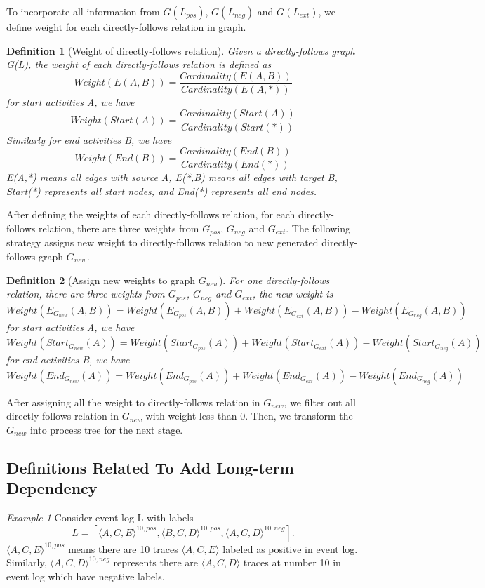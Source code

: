 \documentclass[]{article}
\newtheorem{mydef}{Definition}[section]
\begin{document}
To incorporate all information from  $G(L_{pos})$, $G(L_{neg})$ and $G(L_{ext})$, we define  weight for each directly-follows relation in graph. 
\begin{mydef}[Weight of directly-follows relation]
	Given a directly-follows graph G(L), the weight of each directly-follows relation is defined as \[ Weight(E(A,B)) = \frac{Cardinality(E(A,B))}{Cardinality(E(A,*))}  \] 
	for start activities A, we have 
	\[ Weight(Start(A)) = \frac{Cardinality(Start(A))}{Cardinality(Start(*))} \]
	Similarly for end activities B, we have
	\[ Weight(End(B)) = \frac{Cardinality(End(B))}{Cardinality(End(*))} \]
	E(A,*) means all edges with source A, E(*,B) means all edges with target B, Start(*) represents all start nodes, and End(*) represents all end nodes.
\end{mydef}
After defining the weights of each directly-follows relation, for each directly-follows relation, there are three weights from $G_{pos}$, $G_{neg}$ and $G_{ext}$. The following strategy assigns new weight to directly-follows relation to new generated directly-follows graph $G_{new}$.
\begin{mydef}[Assign new weights to graph $G_{new}$]
	For one directly-follows relation, there are three weights from $G_{pos}$, $G_{neg}$ and $G_{ext}$, the new weight is \[ Weight(E_{G_{new}}(A,B)) = Weight(E_{G_{pos}}(A,B)) + Weight(E_{G_{ext}}(A,B)) - Weight(E_{G_{neg}}(A,B))\]
		for start activities A, we have 
	\[ Weight(Start_{G_{new}}(A)) = Weight(Start_{G_{pos}}(A)) + Weight(Start_{G_{ext}}(A)) - Weight(Start_{G_{neg}}(A)) \]
	for end activities B, we have
	\[ Weight(End_{G_{new}}(A)) = Weight(End_{G_{pos}}(A)) + Weight(End_{G_{ext}}(A)) - Weight(End_{G_{neg}}(A)) \]
\end{mydef}
After assigning all the weight to directly-follows relation in $G_{new}$, we filter out all directly-follows relation in $G_{new}$ with weight less than 0. 
Then, we transform the $G_{new}$ into process tree for the next stage.

\subsection{Definitions Related To Add Long-term Dependency}
\textit{Example 1} Consider event log L with labels \[L =[\langle A,C,E \rangle^{10,pos}, \langle B,C,D \rangle^{10,pos}, \langle A,C,D \rangle^{10,neg}]. \] $\langle A,C,E \rangle^{10,pos}$ means there are 10 traces $\langle A,C,E \rangle$ labeled as positive in event log. Similarly, $\langle A,C,D \rangle^{10,neg}$ represents there are $\langle A,C,D \rangle$ traces at number 10 in event log which have negative labels. 
\end{document}
